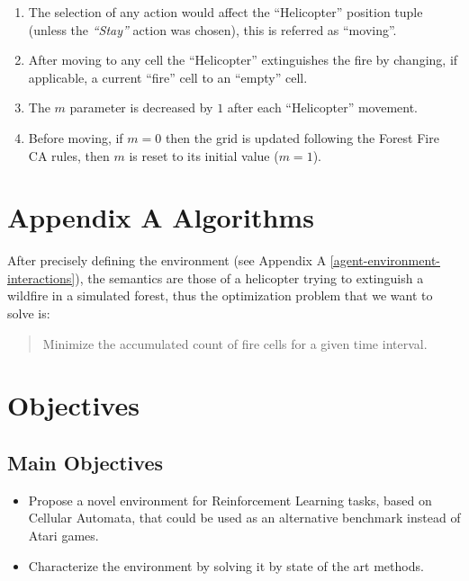 \documentclass[
  12pt,
  openany]{book}
\providecommand{\tightlist}{%
  \setlength{\itemsep}{0pt}\setlength{\parskip}{0pt}}
\begin{document}
\begin{enumerate}
\def\labelenumi{\arabic{enumi}.}
\tightlist
\item
  The selection of any action would affect the ``Helicopter'' position tuple (unless the \emph{``Stay''} action was chosen), this is referred as ``moving''.
\item
  After moving to any cell the ``Helicopter'' extinguishes the fire by changing, if applicable, a current ``fire'' cell to an ``empty'' cell.
\item
  The \(m\) parameter is decreased by \(1\) after each ``Helicopter'' movement.
\item
  Before moving, if \(m=0\) then the grid is updated following the Forest Fire CA rules, then \(m\) is reset to its initial value (\(m=1\)).
\end{enumerate}

\hypertarget{appendix-a-algorithms}{%
\section{Appendix A Algorithms}\label{appendix-a-algorithms}}

After precisely defining the environment (see Appendix A \ref{agent-environment-interactions}), the semantics are those of a helicopter trying to extinguish a wildfire in a simulated forest, thus the optimization problem that we want to solve is:

\begin{quote}
Minimize the accumulated count of fire cells for a given time interval.
\end{quote}

\hypertarget{objectives}{%
\section{Objectives}\label{objectives}}

\hypertarget{main-objectives}{%
\subsection{Main Objectives}\label{main-objectives}}

\begin{itemize}
\tightlist
\item
  Propose a novel environment for Reinforcement Learning tasks, based on Cellular Automata, that could be used as an alternative benchmark instead of Atari games.
\item
  Characterize the environment by solving it by state of the art methods.
\end{itemize}
\end{document}
